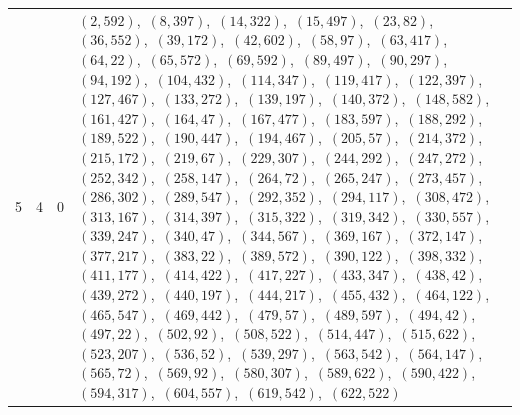 \documentclass[11pt]{article}
\begin{document}
\begin{longtable}{@{}rrl>{\raggedright\arraybackslash}p{}@{}}
5 & 4 & $0$ & $(2,592)$,\allowbreak\ $(8,397)$,\allowbreak\ $(14,322)$,\allowbreak\ $(15,497)$,\allowbreak\ $(23,82)$,\allowbreak\ $(36,552)$,\allowbreak\ $(39,172)$,\allowbreak\ $(42,602)$,\allowbreak\ $(58,97)$,\allowbreak\ $(63,417)$,\allowbreak\ $(64,22)$,\allowbreak\ $(65,572)$,\allowbreak\ $(69,592)$,\allowbreak\ $(89,497)$,\allowbreak\ $(90,297)$,\allowbreak\ $(94,192)$,\allowbreak\ $(104,432)$,\allowbreak\ $(114,347)$,\allowbreak\ $(119,417)$,\allowbreak\ $(122,397)$,\allowbreak\ $(127,467)$,\allowbreak\ $(133,272)$,\allowbreak\ $(139,197)$,\allowbreak\ $(140,372)$,\allowbreak\ $(148,582)$,\allowbreak\ $(161,427)$,\allowbreak\ $(164,47)$,\allowbreak\ $(167,477)$,\allowbreak\ $(183,597)$,\allowbreak\ $(188,292)$,\allowbreak\ $(189,522)$,\allowbreak\ $(190,447)$,\allowbreak\ $(194,467)$,\allowbreak\ $(205,57)$,\allowbreak\ $(214,372)$,\allowbreak\ $(215,172)$,\allowbreak\ $(219,67)$,\allowbreak\ $(229,307)$,\allowbreak\ $(244,292)$,\allowbreak\ $(247,272)$,\allowbreak\ $(252,342)$,\allowbreak\ $(258,147)$,\allowbreak\ $(264,72)$,\allowbreak\ $(265,247)$,\allowbreak\ $(273,457)$,\allowbreak\ $(286,302)$,\allowbreak\ $(289,547)$,\allowbreak\ $(292,352)$,\allowbreak\ $(294,117)$,\allowbreak\ $(308,472)$,\allowbreak\ $(313,167)$,\allowbreak\ $(314,397)$,\allowbreak\ $(315,322)$,\allowbreak\ $(319,342)$,\allowbreak\ $(330,557)$,\allowbreak\ $(339,247)$,\allowbreak\ $(340,47)$,\allowbreak\ $(344,567)$,\allowbreak\ $(369,167)$,\allowbreak\ $(372,147)$,\allowbreak\ $(377,217)$,\allowbreak\ $(383,22)$,\allowbreak\ $(389,572)$,\allowbreak\ $(390,122)$,\allowbreak\ $(398,332)$,\allowbreak\ $(411,177)$,\allowbreak\ $(414,422)$,\allowbreak\ $(417,227)$,\allowbreak\ $(433,347)$,\allowbreak\ $(438,42)$,\allowbreak\ $(439,272)$,\allowbreak\ $(440,197)$,\allowbreak\ $(444,217)$,\allowbreak\ $(455,432)$,\allowbreak\ $(464,122)$,\allowbreak\ $(465,547)$,\allowbreak\ $(469,442)$,\allowbreak\ $(479,57)$,\allowbreak\ $(489,597)$,\allowbreak\ $(494,42)$,\allowbreak\ $(497,22)$,\allowbreak\ $(502,92)$,\allowbreak\ $(508,522)$,\allowbreak\ $(514,447)$,\allowbreak\ $(515,622)$,\allowbreak\ $(523,207)$,\allowbreak\ $(536,52)$,\allowbreak\ $(539,297)$,\allowbreak\ $(563,542)$,\allowbreak\ $(564,147)$,\allowbreak\ $(565,72)$,\allowbreak\ $(569,92)$,\allowbreak\ $(580,307)$,\allowbreak\ $(589,622)$,\allowbreak\ $(590,422)$,\allowbreak\ $(594,317)$,\allowbreak\ $(604,557)$,\allowbreak\ $(619,542)$,\allowbreak\ $(622,522)$\\

\end{longtable}
\end{document}
